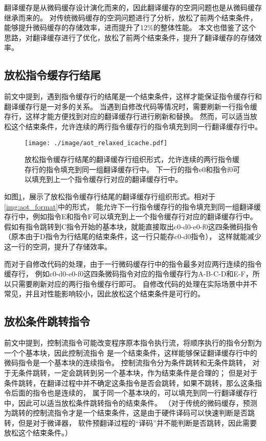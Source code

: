 翻译缓存是从微码缓存设计演化而来的，因此翻译缓存的空洞问题也是从微码缓存继承而来的。
\cite{kotraImprovingUtilizationMicrooperation2020}
对传统微码缓存的空洞问题进行了分析，放松了前两个结束条件，能够提升微码缓存的存储效率，进而提升了12\%的整体性能。
本文也借鉴了这个思路，对翻译缓存进行了优化，放松了前两个结束条件，提升了翻译缓存的存储效率。

\subsection{放松指令缓存行结尾}

前文中提到，遇到指令缓存行的结尾是一个结束条件，这样才能保证指令缓存行和翻译缓存行是一对多的关系。
当遇到自修改代码等情况时，需要刷新一行指令缓存行，这样才能方便找到对应的翻译缓存行进行刷新和替换。
然而，可以适当放松这个结束条件，允许连续的两行指令缓存行的指令填充到同一行翻译缓存行中。

\begin{figure}[!htbp]
    \centering
    \texttt{[image: ./image/aot\_relaxed\_icache.pdf]}
    \caption{放松指令缓存行结尾的翻译缓存行组织形式，允许连续的两行指令缓存行的指令填充到同一组翻译缓存行中。
    下一行的指令e0和指令f0可以填充到上一个指令缓存行对应的翻译缓存行中。
    }
    \label{img:aot_relaxed_icache}
  \end{figure}

如图\ref{img:aot_relaxed_icache}，展示了放松指令缓存行结尾的翻译缓存行组织形式。相对于\ref{img:aot_format}中的形式，
能允许下一行指令缓存行的指令填充到同一组翻译缓存行中，例如指令E和指令F可以填充到上一个指令缓存行对应的翻译缓存行中。
假如有指令跳转到C指令开始的基本块，就能直接取出c0-d0-e0-f0这四条微码指令（原本由于D指令为行结尾的结束条件，这一行只能存c0-d0指令），
这样就能减少这一行的空洞，提升了存储效率。

而对于自修改代码的处理，由于一行微码缓存行中的指令最多对应两行连续的指令缓存行，
例如c0-d0-e0-f0这四条微码指令对应的指令缓存行为A-B-C-D和E-F，所以只需要刷新对应的两行指令缓存行即可。
自修改代码的处理在实际场景中并不常见，并且对性能影响较小，因此放松这个结束条件是可行的。

\subsection{放松条件跳转指令}

前文中提到，控制流指令可能改变程序原本指令执行流，将顺序执行的指令分割为一个个基本块，因此控制流指令
是一个结束条件，这样能够保证翻译缓存行中的微码指令是一个基本块的连续指令。
控制流指令分为条件跳转和无条件跳转，
对于无条件跳转，一定会跳转到另一个基本块，作为结束条件是合理的；
但是对于条件跳转，在翻译过程中并不确定这条指令是否会跳转，如果不跳转，那么这条指令后面的指令也是连续的，
属于同一个基本块的，可以填充到同一行翻译缓存行中，因此可以适当放松条件跳转指令的结束条件。
（对于传统的微码缓存，预测为跳转的控制流指令才是一个结束条件，这是由于硬件译码可以快速判断是否跳转，但是对于微译器，
软件预翻译过程的“译码”并不能判断是否跳转，因此需要放松这个结束条件。）


